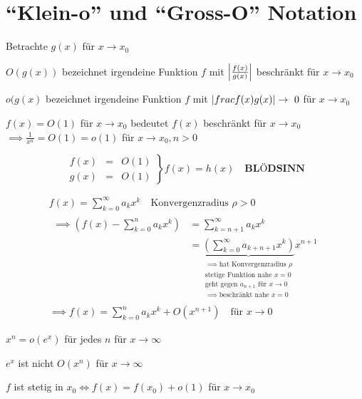 \section{\enquote{Klein-o} und \enquote{Gross-O} Notation}
Betrachte $g(x)$ für $x \rightarrow x_0$\\
\begin{def*}[note = Gross O , index = gross O]
	$O(g(x))$ bezeichnet irgendeine Funktion $f$ mit $\abs{\frac{f(x)}{g(x)}}$ beschränkt für $x \rightarrow x_0$
\end{def*}
\begin{def*}[note = Klein o , index = klein o]
	$o(g(x)$ bezeichnet irgendeine Funktion $f$ mit $\abs{frac{f(x)}{g(x)}} \rightarrow 0$ für $x \rightarrow x_0$
\end{def*}
\begin{bsp*}
	$f(x) = O(1)$ für $x \rightarrow x_0$ bedeutet $f(x)$ beschränkt für $x \rightarrow x_0$ \\
	$\implies \frac{1}{x^n} = O(1) = o(1)$ für $x \rightarrow x_0, n > 0$
\end{bsp*}
\[ \left. \begin{matrix}
	f(x)	&=	&O(1)	\\
	g(x)	&=	&O(1)	
\end{matrix} \right\} f(x) = h(x) \quad \textbf{BLÖDSINN} \]
\begin{bsp*}
	\begin{gather*}
		f(x) = \sum_{k=0}^\infty a_k x^k \quad \text{Konvergenzradius } \rho > 0 \\
		\begin{split}
			\implies \left( f(x) - \sum_{k=0}^n a_k x^k \right)	&= \sum_{k=n+1}^\infty a_k x^k \\
												&= \underbrace{\left(\sum_{k=0}^\infty a_{k+n+1} x^k \right)}_{\substack{\implies\text{hat Konvergenzradius }\rho\\\text{stetige Funktion nahe } x=0\\\text{geht gegen } a_{n+1} \text{ für } x \rightarrow 0\\\implies\text{beschränkt nahe } x=0}} x^{n+1}
		\end{split} \\
		\implies f(x) = \sum_{k=0}^n a_k x^k + O(x^{n+1}) \quad \text{für } x \rightarrow 0
	\end{gather*}
\end{bsp*}
\begin{bsp*}
	$x^n = o(e^x)$ für jedes $n$ für $x \rightarrow \infty$
\end{bsp*}
\begin{bsp*}
	$e^x$ ist nicht $O(x^n)$ für $x \rightarrow \infty$
\end{bsp*}
\begin{bem}
	$f$ ist stetig in $x_0 \iff f(x) = f(x_0) + o(1)$ für $x \rightarrow x_0$
\end{bem}

